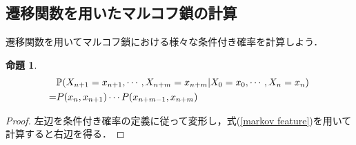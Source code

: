 \documentclass[12pt, a4paper]{jsarticle}
\theoremstyle{definition}
\newtheorem{prop}[thm]{命題}
\begin{document}
\subsection{遷移関数を用いたマルコフ鎖の計算}
遷移関数を用いてマルコフ鎖における様々な条件付き確率を計算しよう．
\begin{screen}
\begin{prop}
\begin{align}
&\mathbb{P}(X_{n+1} = x_{n+1}, \cdots,X_{n+m}=x_{n+m} | X_0 = x_0 ,\cdots, X_n = x_n) \notag \\
 = &P(x_n,x_{n+1})\cdots P(x_{n+m-1} ,x_{n+m}) 
\end{align}
\end{prop}
\end{screen}
\begin{proof}
左辺を条件付き確率の定義に従って変形し，式(\ref{markov feature})を用いて計算すると右辺を得る．
\end{proof}
\end{document}
